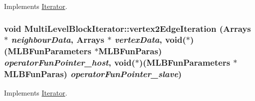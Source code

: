 Implements \hyperlink{classIterator_abe5bcf1a342b1ed4e3a5efe7f630e6d9}{Iterator}.\hypertarget{classMultiLevelBlockIterator_ac4035c51b1a940a7661a7e1b15e7b086}{
\subsubsection[{vertex2EdgeIteration}]{\setlength{\rightskip}{0pt plus 5cm}void MultiLevelBlockIterator::vertex2EdgeIteration ({\bf Arrays} $\ast$ {\em neighbourData}, \/  {\bf Arrays} $\ast$ {\em vertexData}, \/  void($\ast$)({\bf MLBFunParameters} $\ast$MLBFunParas) {\em operatorFunPointer\_\-host}, \/  void($\ast$)({\bf MLBFunParameters} $\ast$MLBFunParas) {\em operatorFunPointer\_\-slave})}}
\label{classMultiLevelBlockIterator_ac4035c51b1a940a7661a7e1b15e7b086}


Implements \hyperlink{classIterator_af3f4a8ad925b4a2029d9b2db74787094}{Iterator}.

